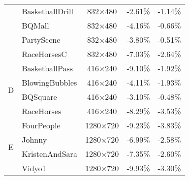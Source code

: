 \begin{table}[!p]
\begin{tabular}{@{}clccc@{}}
                                         & BasketballDrill                           & 832$\times$480          & -2.61\%                            & -1.14\%                       \\
                                         & BQMall                                    & 832$\times$480          & -4.16\%                            & -0.66\%                       \\
                                         & PartyScene                                & 832$\times$480          & -3.80\%                            & -0.51\%                       \\
                                         & RaceHorsesC                               & 832$\times$480          & -7.03\%                            & -2.64\%                       \\
        \multirow{4}{*}{D}               & BasketballPass                            & 416$\times$240          & -9.10\%                            & -1.92\%                       \\
                                         & BlowingBubbles                            & 416$\times$240          & -4.11\%                            & -1.93\%                       \\
                                         & BQSquare                                  & 416$\times$240          & -3.10\%                            & -0.48\%                       \\
                                         & RaceHorses                                & 416$\times$240          & -8.29\%                            & -3.53\%                       \\
        \multirow{6}{*}{E}               & FourPeople                                & 1280$\times$720         & -9.23\%                            & -3.83\%                       \\
                                         & Johnny                                    & 1280$\times$720         & -6.99\%                            & -2.58\%                       \\
                                         & KristenAndSara                            & 1280$\times$720         & -7.35\%                            & -2.60\%                       \\
                                         & Vidyo1                                    & 1280$\times$720         & -9.93\%                            & -3.30\%                       \\

\end{tabular}
\end{table}
